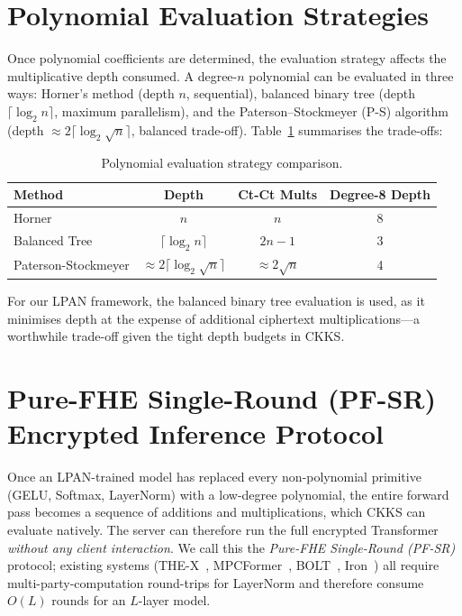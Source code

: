 \section{Polynomial Evaluation Strategies}
\label{sec:eval_strategies}

Once polynomial coefficients are determined, the evaluation strategy affects the multiplicative depth consumed. A degree-$n$ polynomial can be evaluated in three ways: Horner's method (depth $n$, sequential), balanced binary tree (depth $\lceil \log_2 n \rceil$, maximum parallelism), and the Paterson--Stockmeyer (P-S) algorithm~\cite{paterson1973number} (depth $\approx 2\lceil \log_2 \sqrt{n} \rceil$, balanced trade-off). Table~\ref{tab:eval_comparison} summarises the trade-offs:

\begin{table}[htbp]
\centering
\caption{Polynomial evaluation strategy comparison.}
\label{tab:eval_comparison}
\begin{tabular}{lccc}
\toprule
\textbf{Method} & \textbf{Depth} & \textbf{Ct-Ct Mults} & \textbf{Degree-8 Depth} \\
\midrule
Horner           & $n$                                  & $n$                  & 8 \\
Balanced Tree    & $\lceil\log_2 n\rceil$               & $2n - 1$             & 3 \\
Paterson-Stockmeyer & $\approx 2\lceil\log_2\sqrt{n}\rceil$ & $\approx 2\sqrt{n}$ & 4 \\
\bottomrule
\end{tabular}
\end{table}

For our LPAN framework, the balanced binary tree evaluation is used, as it minimises depth at the expense of additional ciphertext multiplications---a worthwhile trade-off given the tight depth budgets in CKKS.


\section{Pure-FHE Single-Round (PF-SR) Encrypted Inference Protocol}
\label{sec:pfsr_protocol}

Once an LPAN-trained model has replaced every non-polynomial primitive (GELU, Softmax, LayerNorm) with a low-degree polynomial, the entire forward pass becomes a sequence of additions and multiplications, which CKKS can evaluate natively. The server can therefore run the full encrypted Transformer \emph{without any client interaction}. We call this the \emph{Pure-FHE Single-Round (PF-SR)} protocol; existing systems (THE-X~\cite{chen2022thex}, MPCFormer~\cite{li2023mpcformer}, BOLT~\cite{pang2024bolt}, Iron~\cite{hao2022iron}) all require multi-party-computation round-trips for LayerNorm and therefore consume $O(L)$ rounds for an $L$-layer model.


